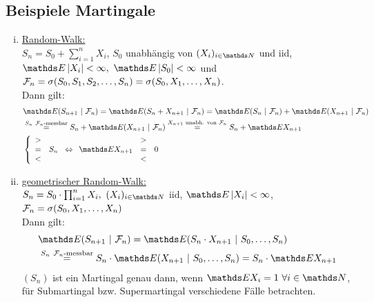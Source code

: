 \subsection{Beispiele Martingale}
\label{sub:bsp_martingale}
\begin{enumerate}[(i)]
	\item \uline{Random-Walk:}\\
	$S_n=S_0+\sum\limits_{i=1}^{n}X_i$, $S_0$ unabhängig von $(X_i)_{i\in \N}$ und iid, $\E\abs{X_i}<\infty,~\E\abs{S_0}<\infty$ und $\mathcal{F}_n=\sigma(S_0,S_1,S_2,\dots,S_n)=\sigma(S_0,X_1,\dots,X_n)$.\\
	Dann gilt:
	\begin{equation*}
	\begin{aligned}
		&\E(S_{n+1}~|~\F_n) = \E(S_n+X_{n+1}~|~\F_n) = \E(S_n~|~\F_n)+\E(X_{n+1}~|~\F_n)\\
		&\stackrel{S_n~\F_n\text{-messbar}}{=} S_n+\E(X_{n+1}~|~\F_n)\stackrel{\tiny X_{n+1}\text{ unabh. von }\F_n}{=}S_n+\E X_{n+1}\\
		&\left\{\begin{array}{lc} > & \\ = & S_n \\ < &   \end{array}\right. \Leftrightarrow \begin{array}{ccc}  & > & \\ \E X_{n+1} & = & 0\\ & < & \end{array}
	\end{aligned}
	\end{equation*}
	\item \uline{geometrischer Random-Walk:}\\
	$S_n=S_0\cdot\prod_{i=1}^{n}X_i,~(X_i)_{i\in \N}$ iid, $\E\abs{X_i}<\infty$, $\mathcal{F}_n=\sigma(S_0,X_1,\dots,X_n)$\\
	Dann gilt:
	\begin{equation*}
	\begin{aligned}
		&\E(S_{n+1}~|~\F_n) = \E(S_n\cdot X_{n+1}~|~S_0,\dots,S_n)\\
		&\stackrel{S_n~\F_n\text{-messbar}}{=} S_n\cdot\E(X_{n+1}~|~S_0,\dots,S_n)=S_n\cdot\E X_{n+1}
	\end{aligned}
	\end{equation*}
	$(S_n)$ ist ein Martingal genau dann, wenn $\E X_i=1~\forall i\in \N$, für Submartingal bzw. Supermartingal verschiedene Fälle betrachten.
\end{enumerate}

